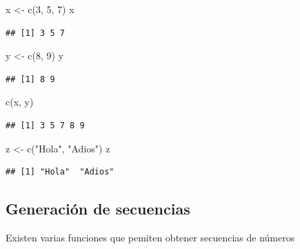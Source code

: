 \documentclass[
]{book}
\newenvironment{Shaded}{\begin{snugshade}}{\end{snugshade}}
\newcommand{\DecValTok}[1]{\textcolor[rgb]{0.00,0.00,0.81}{#1}}
\newcommand{\FunctionTok}[1]{\textcolor[rgb]{0.00,0.00,0.00}{#1}}
\newcommand{\NormalTok}[1]{#1}
\newcommand{\OtherTok}[1]{\textcolor[rgb]{0.56,0.35,0.01}{#1}}
\newcommand{\StringTok}[1]{\textcolor[rgb]{0.31,0.60,0.02}{#1}}
\theoremstyle{break}
\begin{document}
\begin{Shaded}
\begin{Highlighting}[]
\NormalTok{x }\OtherTok{\textless{}{-}} \FunctionTok{c}\NormalTok{(}\DecValTok{3}\NormalTok{, }\DecValTok{5}\NormalTok{, }\DecValTok{7}\NormalTok{)}
\NormalTok{x}
\end{Highlighting}
\end{Shaded}

\begin{verbatim}
## [1] 3 5 7
\end{verbatim}

\begin{Shaded}
\begin{Highlighting}[]
\NormalTok{y }\OtherTok{\textless{}{-}} \FunctionTok{c}\NormalTok{(}\DecValTok{8}\NormalTok{, }\DecValTok{9}\NormalTok{)}
\NormalTok{y}
\end{Highlighting}
\end{Shaded}

\begin{verbatim}
## [1] 8 9
\end{verbatim}

\begin{Shaded}
\begin{Highlighting}[]
\FunctionTok{c}\NormalTok{(x, y)}
\end{Highlighting}
\end{Shaded}

\begin{verbatim}
## [1] 3 5 7 8 9
\end{verbatim}

\begin{Shaded}
\begin{Highlighting}[]
\NormalTok{z }\OtherTok{\textless{}{-}} \FunctionTok{c}\NormalTok{(}\StringTok{"Hola"}\NormalTok{, }\StringTok{"Adios"}\NormalTok{)}
\NormalTok{z}
\end{Highlighting}
\end{Shaded}

\begin{verbatim}
## [1] "Hola"  "Adios"
\end{verbatim}

\hypertarget{generaciuxf3n-de-secuencias}{%
\subsection{Generación de secuencias}\label{generaciuxf3n-de-secuencias}}

Existen varias funciones que pemiten obtener secuencias de números
\end{document}
